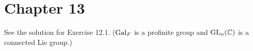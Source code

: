 \newpage
\section{Chapter 13}

\begin{problem} \notfinish
\end{problem}

\begin{problem} \notfinish
\end{problem}

\begin{problem} \notfinish
\end{problem}

\begin{problem}
See the solution for Exercise 12.1. ($\operatorname{\mathrm{Gal}}_F$ is a profinite group and $\operatorname{\mathrm{GL}}_n(\mathbb{C})$ is a connected Lie group.)
\end{problem}

\begin{problem} \notfinish
\end{problem}